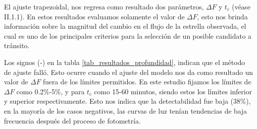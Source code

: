 El ajuste trapezoidal, nos regresa como resultado dos parámetros, $\Delta F$ y $t_{c}$ (véase II.1.1). En estos resultados evaluamos solamente el valor de $\Delta F$, esto nos brinda información sobre la magnitud del cambio en el flujo de la estrella observada, el cual es uno de los principales criterios para la selección de un posible candidato a tránsito. 

Los signos (-) en la tabla \ref{tab_resultados_profundidad}, indican que el método de ajuste falló. Esto ocurre cuando el ajuste del modelo nos da como resultado un valor de $\Delta F$ fuera de los límites permitidos. En este estudio fijamos los límites de $\Delta F$ como 0.2\%-5\%, y para $t_{c}$ como 15-60 minutos, siendo estos los límites inferior y superior respectivamente. Esto nos indica que la detectabilidad fue baja (38\%), en la mayoría de los casos negativos, las curvas de luz tenían tendencias de baja frecuencia después del proceso de fotometría.